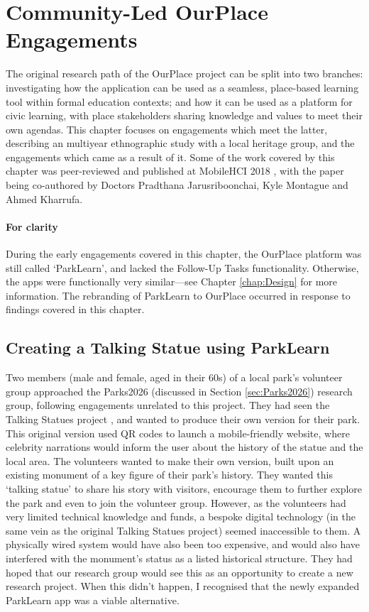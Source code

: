 \chapter{Community-Led OurPlace Engagements}
The original research path of the OurPlace project can be split into two branches: investigating how the application can be used as a seamless, place-based learning tool within formal education contexts; and how it can be used as a platform for civic learning, with place stakeholders sharing knowledge and values to meet their own agendas. This chapter focuses on engagements which meet the latter, describing an multiyear ethnographic study with a local heritage group, and the engagements which came as a result of it. Some of the work covered by this chapter was peer-reviewed and published at MobileHCI 2018 \citep{Richardson2018}, with the paper being co-authored by Doctors Pradthana Jarusriboonchai, Kyle Montague and Ahmed Kharrufa.

\subsubsection{For clarity}
During the early engagements covered in this chapter, the OurPlace platform was still called `ParkLearn', and lacked the Follow-Up Tasks functionality. Otherwise, the apps were functionally very similar---see Chapter \ref{chap:Design} for more information. The rebranding of ParkLearn to OurPlace occurred in response to findings covered in this chapter.

\section{Creating a Talking Statue using ParkLearn}

Two members (male and female, aged in their 60s) of a local park's volunteer group approached the Parks2026 (discussed in Section \ref{sec:Parks2026}) research group, following engagements unrelated to this project. They had seen the Talking Statues project \citep{Sing2017}, and wanted to produce their own version for their park. This original version used QR codes to launch a mobile-friendly website, where celebrity narrations would inform the user about the history of the statue and the local area. The volunteers wanted to make their own version, built upon an existing monument of a key figure of their park's history. They wanted this `talking statue' to share his story with visitors, encourage them to further explore the park and even to join the volunteer group. However, as the volunteers had very limited technical knowledge and funds, a bespoke digital technology (in the same vein as the original Talking Statues project) seemed inaccessible to them. A physically wired system would have also been too expensive, and would also have interfered with the monument’s status as a listed historical structure. They had hoped that our research group would see this as an opportunity to create a new research project. When this didn't happen, I recognised that the newly expanded ParkLearn app was a viable alternative.

